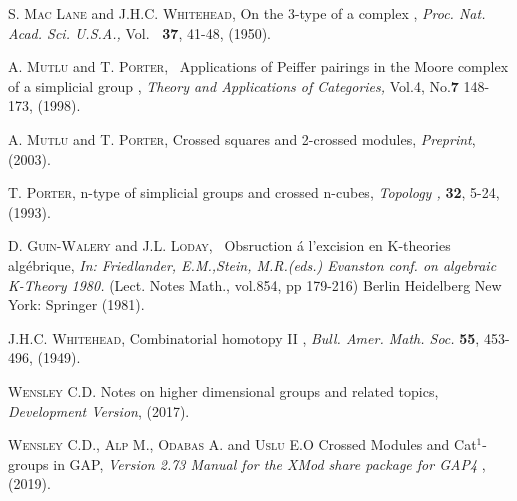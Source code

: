 \documentclass[a4paper,11pt]{article}
\theoremstyle{plain}
\theoremstyle{definition}
\begin{document}
\begin{thebibliography}{99}
	 \textsc{S. Mac Lane} and \textsc{J.H.C. Whitehead}, \textrm{On
		the 3-type of a complex }, \emph{Proc. Nat. Acad. Sci. U.S.A.,} Vol. \textbf{%
		\ 37}, 41-48, (1950).
	
	 \textsc{A. Mutlu} and \textsc{T. Porter}, \textrm{\
		Applications of Peiffer pairings in the Moore complex of a simplicial group}
	, \emph{Theory and Applications of Categories, } Vol.4, No.\textbf{7}
	148-173, (1998).
	
	 \textsc{A. Mutlu} and \textsc{T. Porter}, \textrm{Crossed
		squares and 2-crossed modules}, \emph{Preprint}, (2003).
	
	 \textsc{T. Porter}, \textrm{n-type of simplicial groups and
		crossed n-cubes}, \emph{Topology ,} \textbf{32}, 5-24, (1993).
	
	 \textsc{D. Guin-Walery} and \textsc{J.L. Loday}, \textrm{\
		Obsruction {\'{a}} l'excision en K-theories alg{\'{e}}brique, } \emph{In:
		Friedlander, E.M.,Stein, M.R.(eds.) Evanston conf. on algebraic K-Theory
		1980.} (Lect. Notes Math., vol.854, pp 179-216) Berlin Heidelberg New York:
	Springer (1981).
	
	 \textsc{J.H.C. Whitehead}, \textrm{Combinatorial homotopy
		II }, \emph{Bull. Amer. Math. Soc.} \textbf{55}, 453-496, (1949).
	
	\bibitem{wensley_notes} \textsc{Wensley C.D.} Notes on higher dimensional
	groups and related topics, \emph{Development Version}, (2017).
	
	 \textsc{Wensley C.D., Alp M., Odabas A.} and \textsc{Uslu E.O }
	Crossed Modules and Cat$^{1}$-groups in \textsf{GAP}, \emph{Version 2.73
		Manual for the \textsf{XMod} share package for \textsf{GAP}4 }, (2019).
\end{thebibliography}
\end{document}
